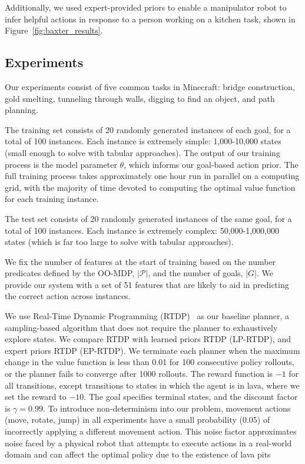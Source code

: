 \documentclass[11pt]{article}
\begin{document}
Additionally, we used expert-provided priors to
enable a manipulator robot to infer helpful actions in response to a
person working on a kitchen task, shown in Figure~\ref{fig:baxter_results}.


\subsection{Experiments}

Our experiments consist of five common tasks in Minecraft:
bridge construction, gold smelting, tunneling through
walls, digging to find an object, and path planning.

The training set consists of 20 randomly generated instances of each goal, for a total of 100 instances. Each instance is extremely simple: 1,000-10,000 states (small enough to solve with tabular approaches). The output of our training process is the model parameter $\theta$, which informs our goal-based action prior. The full training process takes approximately one hour run in parallel on a computing grid, with the majority of time devoted to computing the optimal value function for each training instance.

The test set consists of 20 randomly generated instances of the same goal, for a total of 100 instances. Each instance is extremely complex: 50,000-1,000,000 states (which is far too large to solve with tabular approaches).

We fix the number of features at the start of training based on the number
predicates defined by the OO-MDP, $|\mathcal{P}|$, and the number of goals, $|G|$.
We provide our system with a set of 51 features that are likely to aid in predicting the correct action across instances.

We use Real-Time Dynamic Programming (RTDP)~\cite{barto95} as our
baseline planner, a sampling-based algorithm that does not require the
planner to exhaustively explore states. We compare RTDP with learned
priors RTDP (LP-RTDP), and expert priors RTDP (EP-RTDP).
We terminate each planner when the maximum change in
the value function is less than 0.01 for 100 consecutive policy
rollouts, or the planner fails to converge after 1000 rollouts.  The
reward function is $-1$ for all transitions, except transitions to
states in which the agent is in lava, where we set the reward to
$-10$. The goal specifies terminal states, and the discount factor is
$\gamma = 0.99$.  To introduce non-determinism into our problem,
movement actions (move, rotate, jump) in all experiments have a small
probability (0.05) of incorrectly applying a different movement
action.  This noise factor approximates noise faced by a physical
robot that attempts to execute actions in a real-world domain and
can affect the optimal policy due to the existence of lava pits
\end{document}
